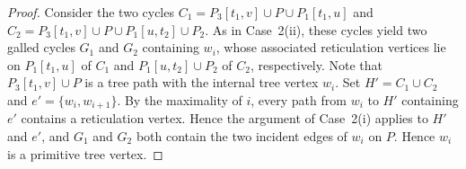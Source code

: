 \documentclass[10pt,a4paper]{amsart}
\theoremstyle{plain}
\theoremstyle{thmstyleone}
\theoremstyle{thmstyletwo}
\theoremstyle{thmstylethree}
\begin{document}
\begin{proof}
Consider the two cycles
$C_1=P_3[t_1,v]\cup P\cup P_1[t_1,u]$
and
$C_2=P_3[t_1,v]\cup P\cup P_1[u,t_2]\cup P_2$.
As in Case~2(ii), these cycles yield two galled cycles $G_1$ and $G_2$ containing $w_i$, whose associated reticulation vertices lie on $P_1[t_1,u]$ of $C_1$ and $P_1[u,t_2]\cup P_2$ of $C_2$, respectively. Note that $P_3[t_1,v]\cup P$ is a tree path with the internal tree vertex $w_i$. Set $H'=C_1\cup C_2$ and $e'=\{w_i,w_{i+1}\}$. By the maximality of $i$, every path from $w_i$ to $H'$ containing $e'$ contains a reticulation vertex. Hence the argument of Case~2(i) applies to $H'$ and $e'$, and $G_1$ and $G_2$ both contain the two incident edges of $w_i$ on $P$. Hence $w_i$ is a primitive tree vertex.
\end{proof}
\end{document}
